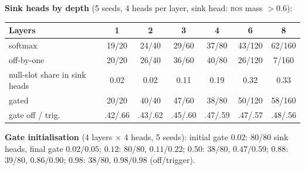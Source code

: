 \documentclass{article} %
\newcommand{\bos}{\textsc{bos}}
\begin{document}
\textbf{Sink heads by depth} (5 seeds, 4 heads per layer, sink head: \bos{} mass $>0.6$):
\begin{center}
\small
\begin{tabular}{lcccccc}
\toprule
Layers & 1 & 2 & 3 & 4 & 6 & 8 \\
\midrule
softmax & 19/20 & 24/40 & 29/60 & 37/80 & 43/120 & 62/160 \\
off-by-one & 20/20 & 26/40 & 36/60 & 40/80 & 26/120 & 7/160 \\
\quad null-slot share in sink heads & 0.02 & 0.02 & 0.11 & 0.19 & 0.32 & 0.33 \\
gated & 20/20 & 40/40 & 47/60 & 38/80 & 50/120 & 58/160 \\
\quad gate off / trig. & .42/.66 & .43/.62 & .45/.60 & .47/.59 & .47/.57 & .48/.56 \\
\bottomrule
\end{tabular}
\end{center}

\textbf{Gate initialisation} (4 layers $\times$ 4 heads, 5 seeds): initial gate $0.02$: 80/80 sink heads,
final gate $0.02/0.05$; $0.12$: 80/80, $0.11/0.22$; $0.50$: 38/80, $0.47/0.59$; $0.88$: 39/80,
$0.86/0.90$; $0.98$: 38/80, $0.98/0.98$ (off/trigger).
\end{document}
